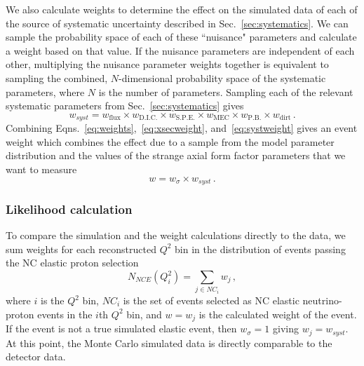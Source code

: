     We also calculate weights to determine the effect on the simulated data of
    each of the source of systematic uncertainty described in
    Sec.~\ref{sec:systematics}.  We can sample the probability space of each of
    these ``nuisance" parameters and calculate a weight based on that value.
    If the nuisance parameters are independent of each other, multiplying the
    nuisance parameter weights together is equivalent to sampling the combined,
    $N$-dimensional probability space of the systematic parameters, where $N$
    is the number of parameters. Sampling each of the relevant systematic
    parameters from Sec.~\ref{sec:systematics} gives
    \begin{equation}\label{eq:systweight}
      w_{syst} = w_{\textrm{flux}} \times w_{\textrm{D.I.C.}}\times w_{\textrm{S.P.E.}}\times
                 w_{\textrm{MEC}} \times w_{\textrm{P.B.}} \times w_{\textrm{dirt}}\,.
    \end{equation}
    Combining Eqns.~\ref{eq:weights},~\ref{eq:xsecweight},
    and~\ref{eq:systweight} gives an event weight which combines the effect
    due to a sample from the model parameter distribution and the values of the
    strange axial form factor parameters that we want to measure
    \begin{equation}
      w = w_{\sigma}\times w_{syst} \,.
    \end{equation}

  \subsubsection{Likelihood calculation}\label{sec:likelihood}
    To compare the simulation and the weight calculations directly to the data,
    we sum weights for each reconstructed $Q^2$ bin in the distribution of
    events passing the NC elastic proton selection
    \begin{equation}\label{eq:expected}
      N_{NCE}(Q^2_i) = \sum\limits_{j\in NC_i} w_j \,,
    \end{equation}
    where $i$ is the $Q^2$ bin, $NC_i$ is the set of events selected as NC
    elastic neutrino-proton events in the $i$th $Q^2$ bin, and $w = w_j$ is the
    calculated weight of the event. If the event is not a true simulated
    elastic event, then $w_\sigma = 1$ giving $w_j = w_{syst}$. At this point,
    the Monte Carlo simulated data is directly comparable to the detector data.

